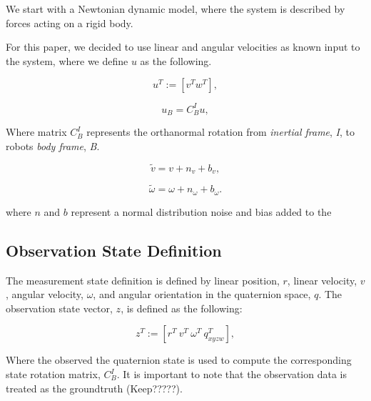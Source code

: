 \documentclass[letterpaper, 10 pt, conference]{ieeeconf}  %
\newcommand{\transpose}[1]{\ensuremath{#1^{\scriptscriptstyle T}}}
\begin{document}
We start with a Newtonian dynamic model, where the system is described by forces
acting on a rigid body.


For this paper, we decided to use linear and angular velocities as known input
to the system, where we define $u$ as the following.

\begin{equation} \label{eqn:1}
\transpose{u} := \left[ \transpose{v} \transpose{w} \right],
\end{equation}

\begin{equation} \label{eq:2}
u_{B} = {C}^{I}_{B} u,
\end{equation}


Where matrix ${C}^{I}_{B}$ represents the orthanormal rotation from \textit{inertial frame},
\textit{I}, to robots \textit{body frame}, \textit{B}.



\begin{equation} \label{eq:3}
\widetilde{v}= v + n_{v} + b_{v},
\end{equation}


\begin{equation} \label{eq:4}
\widetilde{\omega} = \omega + n_{\omega} + b_{\omega}.
\end{equation}

where $n$ and $b$ represent a normal distribution noise and bias added to the







\subsection{Observation State Definition}

The measurement state definition is defined by linear position, $r$, linear
velocity, $v$, angular velocity, $\omega$, and angular orientation in the quaternion
space, $q$. The observation state vector, $z$, is defined as the following:

\begin{equation} \label{eq:5}
\transpose{z} :=  \left[\transpose{r}~\transpose{v}~\transpose{\omega}~\transpose{q_{xyzw}} \right],
\end{equation}


Where the observed the quaternion state is used to compute the corresponding state
rotation matrix, ${C}^{I}_{B}$.
It is important to note that the observation data is treated as the groundtruth (Keep?????).
\end{document}

